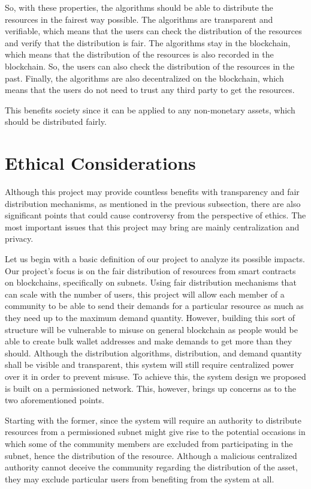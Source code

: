 \documentclass[a4paper,12pt]{report}
\begin{document}
\newpage

So, with these properties, the algorithms should be able to distribute the resources in the fairest way possible. The algorithms are transparent and verifiable, which means that the users can check the distribution of the resources and verify that the distribution is fair. The algorithms stay in the blockchain, which means that the distribution of the resources is also recorded in the blockchain. So, the users can also check the distribution of the resources in the past. Finally, the algorithms are also decentralized on the blockchain, which means that the users do not need to trust any third party to get the resources.

This benefits society since it can be applied to any non-monetary assets, which should be distributed fairly.

\section{Ethical Considerations}
Although this project may provide countless benefits with transparency and fair distribution mechanisms, as mentioned in the previous subsection, there are also significant points that could cause controversy from the perspective of ethics. The most important issues that this project may bring are mainly centralization and privacy. 

Let us begin with a basic definition of our project to analyze its possible impacts. Our project’s focus is on the fair distribution of resources from smart contracts on blockchains, specifically on subnets. Using fair distribution mechanisms that can scale with the number of users, this project will allow each member of a community to be able to send their demands for a particular resource as much as they need up to the maximum demand quantity. However, building this sort of structure will be vulnerable to misuse on general blockchain as people would be able to create bulk wallet addresses and make demands to get more than they should. Although the distribution algorithms, distribution, and demand quantity shall be visible and transparent, this system will still require centralized power over it in order to prevent misuse. To achieve this, the system design we proposed is built on a permissioned network. This, however, brings up concerns as to the two aforementioned points.

Starting with the former, since the system will require an authority to distribute resources from a permissioned subnet might give rise to the potential occasions in which some of the community members are excluded from participating in the subnet, hence the distribution of the resource. Although a malicious centralized authority cannot deceive the community regarding the distribution of the asset, they may exclude particular users from benefiting from the system at all. 
\end{document}
